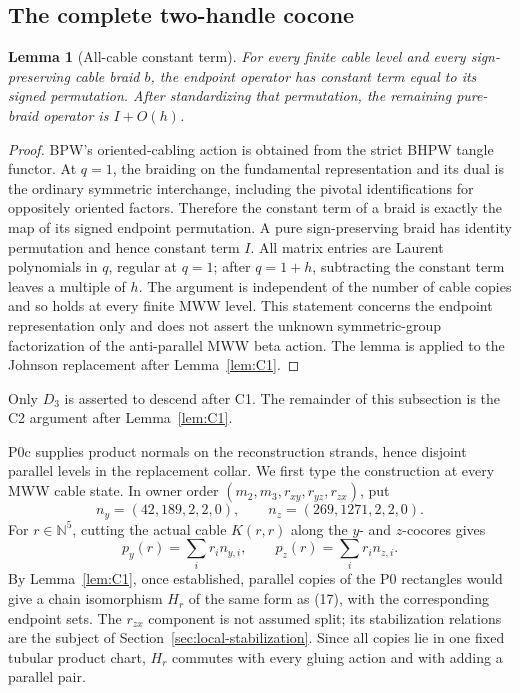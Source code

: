 \documentclass[11pt]{amsart}
\newtheorem{lemma}[theorem]{Lemma}
\theoremstyle{definition}
\theoremstyle{remark}
\begin{document}
\subsection{The complete two-handle cocone}

\begin{lemma}[All-cable constant term]\label{lem:C2}
For every finite cable level and every sign-preserving cable braid \(b\),
the endpoint operator has constant term equal to its signed permutation.
After standardizing that permutation, the remaining pure-braid operator is
\(I+O(h)\).
\end{lemma}

\begin{proof}
BPW's oriented-cabling action is obtained from the strict BHPW tangle
functor.  At \(q=1\), the braiding on the fundamental representation and its
dual is the ordinary symmetric interchange, including the pivotal
identifications for oppositely oriented factors.  Therefore the constant
term of a braid is exactly the map of its signed endpoint permutation.  A
pure sign-preserving braid has identity permutation and hence constant term
\(I\).  All matrix entries are Laurent polynomials in \(q\), regular at
\(q=1\); after \(q=1+h\), subtracting the constant term leaves a multiple of
\(h\).  The argument is independent of the number of cable copies and so
holds at every finite MWW level.  This statement concerns the endpoint
representation only and does not assert the unknown symmetric-group
factorization of the anti-parallel MWW beta action.
The lemma is applied to the Johnson replacement after Lemma~\ref{lem:C1}.
\end{proof}

Only $D_3$ is asserted to descend after C1.  The remainder of this
subsection is the C2 argument after Lemma~\ref{lem:C1}.

P0c supplies product normals on the reconstruction strands, hence disjoint
parallel levels in the replacement collar.  We first type the construction at every MWW
cable state.  In owner order $(m_2,m_3,r_{xy},r_{yz},r_{zx})$, put
\[
n_y=(42,189,2,2,0),\qquad n_z=(269,1271,2,2,0).
\]
For $r\in\mathbb N^5$, cutting the actual cable $K(r,r)$ along the $y$- and
$z$-cocores gives
\[
p_y(r)=\sum_i r_i n_{y,i},\qquad
p_z(r)=\sum_i r_i n_{z,i}.
\tag{24}
\]
By Lemma~\ref{lem:C1}, once established, parallel copies of the P0 rectangles would give a chain isomorphism $H_r$ of the
same form as (17), with the corresponding endpoint sets.  The
$r_{zx}$ component is not assumed split; its stabilization relations are
the subject of Section~\ref{sec:local-stabilization}.  Since all
copies lie in one fixed tubular product chart, $H_r$ commutes with every
gluing action and with adding a parallel pair.
\end{document}
